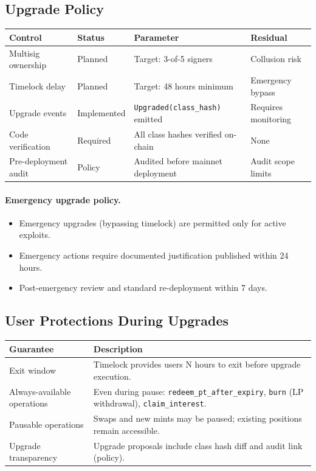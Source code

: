 \subsection{Upgrade Policy}

\begin{center}
\begin{tabularx}{\textwidth}{l l >{\raggedright\arraybackslash}X l}
\toprule
\textbf{Control} & \textbf{Status} & \textbf{Parameter} & \textbf{Residual} \\
\midrule
Multisig ownership & Planned & Target: 3-of-5 signers & Collusion risk \\
Timelock delay & Planned & Target: 48 hours minimum & Emergency bypass \\
Upgrade events & Implemented & \texttt{Upgraded(class\_hash)} emitted & Requires monitoring \\
Code verification & Required & All class hashes verified on-chain & None \\
Pre-deployment audit & Policy & Audited before mainnet deployment & Audit scope limits \\
\bottomrule
\end{tabularx}
\end{center}

\paragraph{Emergency upgrade policy.}
\begin{itemize}
\item Emergency upgrades (bypassing timelock) are permitted only for active exploits.
\item Emergency actions require documented justification published within 24 hours.
\item Post-emergency review and standard re-deployment within 7 days.
\end{itemize}

\subsection{User Protections During Upgrades}

\begin{center}
\begin{tabularx}{\textwidth}{l >{\raggedright\arraybackslash}X}
\toprule
\textbf{Guarantee} & \textbf{Description} \\
\midrule
Exit window & Timelock provides users N hours to exit before upgrade execution. \\
Always-available operations & Even during pause: \texttt{redeem\_pt\_after\_expiry}, \texttt{burn} (LP withdrawal), \texttt{claim\_interest}. \\
Pausable operations & Swaps and new mints may be paused; existing positions remain accessible. \\
Upgrade transparency & Upgrade proposals include class hash diff and audit link (policy). \\
\bottomrule
\end{tabularx}
\end{center}

